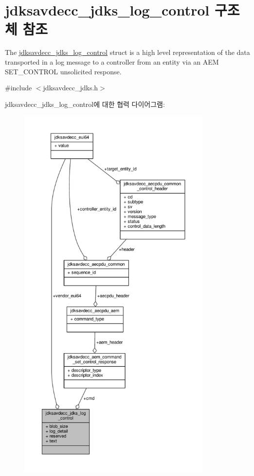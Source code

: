 \hypertarget{structjdksavdecc__jdks__log__control}{}\section{jdksavdecc\+\_\+jdks\+\_\+log\+\_\+control 구조체 참조}
\label{structjdksavdecc__jdks__log__control}


The \hyperlink{structjdksavdecc__jdks__log__control}{jdksavdecc\+\_\+jdks\+\_\+log\+\_\+control} struct is a high level representation of the data transported in a log message to a controller from an entity via an A\+EM S\+E\+T\+\_\+\+C\+O\+N\+T\+R\+OL unsolicited response.  




{\ttfamily \#include $<$jdksavdecc\+\_\+jdks.\+h$>$}



jdksavdecc\+\_\+jdks\+\_\+log\+\_\+control에 대한 협력 다이어그램\+:
\nopagebreak
\begin{figure}[H]
\begin{center}
\leavevmode
\includegraphics[height=550pt]{structjdksavdecc__jdks__log__control__coll__graph}
\end{center}
\end{figure}
